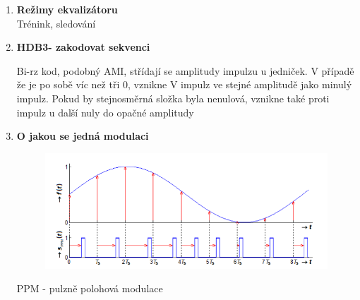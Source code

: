 \begin{enumerate}
    \item \textbf{Režimy ekvalizátoru}\\
      Trénink, sledování
    \item \textbf{HDB3- zakodovat sekvenci}

    Bi-rz kod, podobný  AMI, střídají se amplitudy impulzu u jedniček. V případě že je po sobě víc než tři 0, vznikne V impulz ve stejné amplitudě jako minulý impulz. Pokud by stejnosměrná složka byla nenulová, vznikne také proti impulz u další nuly do opačné amplitudy

    \item  \textbf{O jakou se jedná modulaci}\\
    \begin{figure}[h!]
        \centering
        \includegraphics{images/PPM.png}
        \label{fig:enter-label}
    \end{figure}
    PPM - pulzně polohová modulace
\end{enumerate}